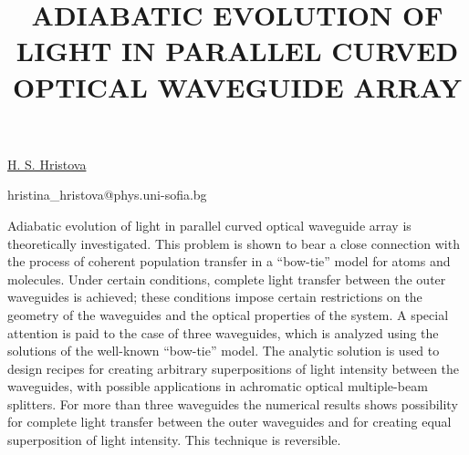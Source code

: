 \title{ADIABATIC EVOLUTION OF LIGHT IN PARALLEL CURVED OPTICAL WAVEGUIDE ARRAY}

\underline{H. S. Hristova}

{\normalsize{

\vspace{-4mm} \unisofia

\email hristina\_hristova@phys.uni-sofia.bg}}

Adiabatic evolution of light in parallel curved optical waveguide array is theoretically
investigated. This problem is shown to bear a close connection with the process of coherent
population transfer in a ``bow-tie'' model for atoms and molecules. Under certain conditions,
complete light transfer between the outer waveguides is achieved; these conditions impose certain
restrictions on the geometry of the waveguides and the optical properties of the system. A special
attention is paid to the case of three waveguides, which is analyzed using the solutions of the
well-known ``bow-tie'' model. The analytic solution is used to design recipes for creating arbitrary
superpositions of light intensity between the waveguides, with possible applications in achromatic
optical multiple-beam splitters. For more than three waveguides the numerical results shows
possibility for complete light transfer between the outer waveguides and for creating equal
superposition of light intensity. This technique is reversible.

\vspace{\baselineskip}
